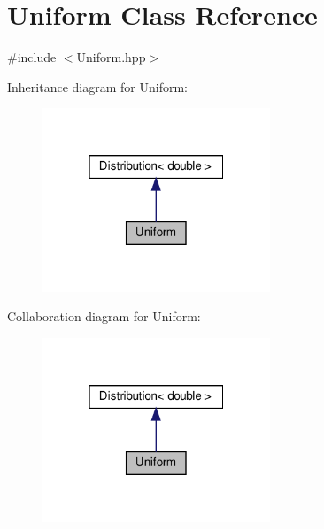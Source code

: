 \hypertarget{class_uniform}{}\section{Uniform Class Reference}
\label{class_uniform}


{\ttfamily \#include $<$Uniform.\+hpp$>$}



Inheritance diagram for Uniform\+:\nopagebreak
\begin{figure}[H]
\begin{center}
\leavevmode
\includegraphics[width=193pt]{class_uniform__inherit__graph}
\end{center}
\end{figure}


Collaboration diagram for Uniform\+:\nopagebreak
\begin{figure}[H]
\begin{center}
\leavevmode
\includegraphics[width=193pt]{class_uniform__coll__graph}
\end{center}
\end{figure}
